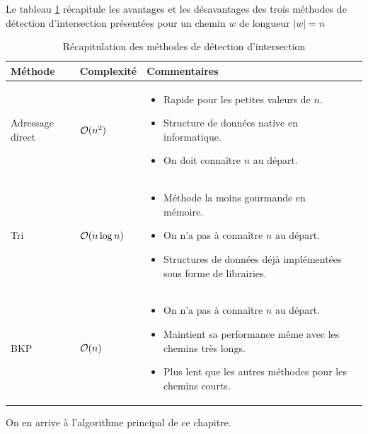Le tableau \ref{fig:recapitulation-intersections} récapitule les avantages et les désavantages des trois méthodes de détection d'intersection présentées pour un chemin $w$ de longueur $|w|=n$

\begin{table}
\begin{tabular}{|l|l|l|l|}
\hline
Méthode & Complexité & Commentaires \\
\hline
Adressage direct & $\mathcal{O}(n^2)$ & \parbox{.6\textwidth}{\vspace{.33\baselineskip}
\begin{itemize}[leftmargin=*]
\item Rapide pour les petites valeurs de $n$.
\item Structure de données native en informatique.
\item On doit connaître $n$ au départ.
\end{itemize}\vspace{.25\baselineskip}}\\
\hline
Tri & $\mathcal{O}(n \log n)$ & \parbox{.6\textwidth}{\vspace{.33\baselineskip}
\begin{itemize}[leftmargin=*]
\item Méthode la moins gourmande en mémoire.
\item On n'a pas à connaître $n$ au départ.
\item Structures de données déjà implémentées sous forme de librairies.
\end{itemize}\vspace{.25\baselineskip}}\\
\hline
BKP & $\mathcal{O}(n)$ & \parbox{.6\textwidth}{\vspace{.33\baselineskip}
\begin{itemize}[leftmargin=*]
\item On n'a pas à connaître $n$ au départ.
\item Maintient sa performance même avec les chemins très longs.
\item Plus lent que les autres méthodes pour les chemins courts.
\end{itemize}\vspace{.25\baselineskip}}\\
\hline
\end{tabular}
\caption{Récapitulation des méthodes de détection d'intersection}\label{fig:recapitulation-intersections}
\end{table}

On en arrive à l'algorithme principal de ce chapitre.

